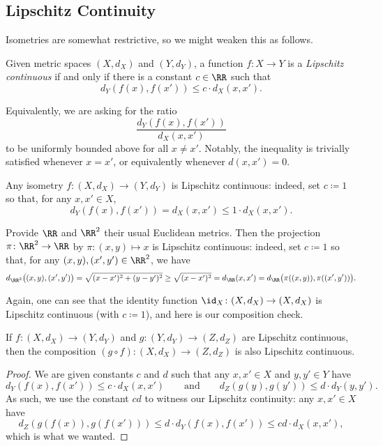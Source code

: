 \documentclass[../notes.tex]{subfiles}
\begin{document}
\subsection{Lipschitz Continuity}
Isometries are somewhat restrictive, so we might weaken this as follows.
\begin{definition} \label{defi:lipcont}
	Given metric spaces $(X,d_X)$ and $(Y,d_Y)$, a function $f\colon X\to Y$ is a \textit{Lipschitz continuous} if and only if there is a constant $c\in\RR$ such that
	\[d_Y(f(x),f(x'))\le c\cdot d_X(x,x').\]
\end{definition}
\begin{remark} \label{rem:lipasratio}
	Equivalently, we are asking for the ratio
	\[\frac{d_Y(f(x),f(x'))}{d_X(x,x')}\]
	to be uniformly bounded above for all $x\ne x'$. Notably, the inequality is trivially satisfied whenever $x=x'$, or equivalently whenever $d(x,x')=0$.
\end{remark}
\begin{example}
	Any isometry $f\colon(X,d_X)\to(Y,d_Y)$ is Lipschitz continuous: indeed, set $c\coloneqq1$ so that, for any $x,x'\in X$,
	\[d_Y(f(x),f(x'))=d_X(x,x')\le1\cdot d_X(x,x').\]
\end{example}
\begin{example} \label{ex:projectislip}
	Provide $\RR$ and $\RR^2$ their usual Euclidean metrics. Then the projection $\pi\colon\RR^2\to\RR$ by $\pi\colon(x,y)\mapsto x$ is Lipschitz continuous: indeed, set $c\coloneqq1$ so that, for any $(x,y),(x',y')\in\RR^2$, we have
	\[d_{\RR^2}\big((x,y),(x',y')\big)=\sqrt{(x-x')^2+(y-y')^2}\ge\sqrt{(x-x')^2}=d_\RR(x,x')=d_\RR\big(\pi((x,y)),\pi((x',y'))\big).\]
\end{example}
Again, one can see that the identity function ${\id_X}\colon(X,d_X)\to(X,d_X)$ is Lipschitz continuous (with $c\coloneqq1$), and here is our composition check.
\begin{lemma}
	If $f\colon(X,d_X)\to(Y,d_Y)$ and $g\colon(Y,d_Y)\to(Z,d_Z)$ are Lipschitz continuous, then the composition $(g\circ f)\colon(X,d_X)\to(Z,d_Z)$ is also Lipschitz continuous.
\end{lemma}
\begin{proof}
	We are given constants $c$ and $d$ such that any $x,x'\in X$ and $y,y'\in Y$ have
	\[d_Y(f(x),f(x'))\le c\cdot d_X(x,x')\qquad\text{and}\qquad d_Z(g(y),g(y'))\le d\cdot d_Y(y,y').\]
	As such, we use the constant $cd$ to witness our Lipschitz continuity: any $x,x'\in X$ have
	\[d_Z(g(f(x)),g(f(x')))\le d\cdot d_Y(f(x),f(x'))\le cd\cdot d_X(x,x'),\]
	which is what we wanted.
\end{proof}
\end{document}
